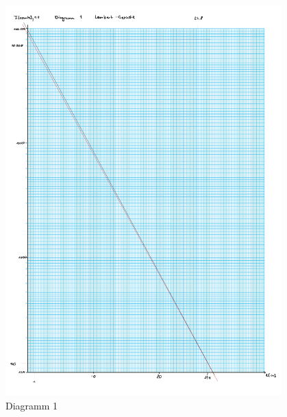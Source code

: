 \begin{figure}[h!]
    \centering
    \includegraphics[page=1, width=0.95\textwidth,]{Netzpapiere_BiotechII.pdf}
    \caption{Diagramm 1}
\end{figure}
\newpage
